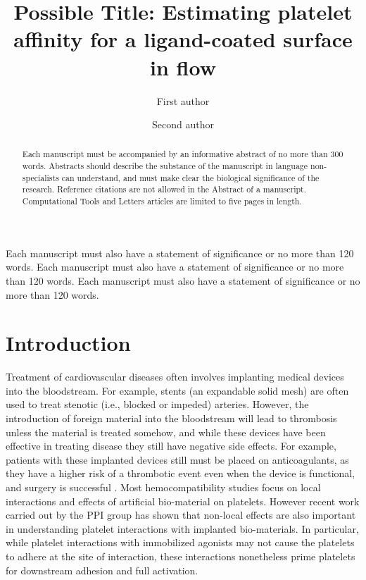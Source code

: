 \documentclass{biophys-new}
\title{Possible Title: Estimating platelet affinity for a
  ligand-coated surface in flow}
\author[1,*]{First author}
\author[2]{Second author}
\affil[1]{Institution A, Address A}
\affil[2]{Institution B, Address B}
\begin{document}
\begin{frontmatter}

\begin{abstract}
Each manuscript must be accompanied by an informative abstract of no
more than 300 words. Abstracts should describe the substance of the
manuscript in language non-specialists can understand, and must make
clear the biological significance of the research. Reference citations
are not allowed in the Abstract of a manuscript. Computational Tools
and Letters articles are limited to five pages in length. 
\end{abstract}

\begin{sigstatement}
Each manuscript must also have a statement of significance or no more
than 120 words. Each manuscript must also have a statement of
significance or no more than 120 words. Each manuscript must also have
a statement of significance or no more than 120 words. 
\end{sigstatement}
\end{frontmatter}

\section*{Introduction}

Treatment of cardiovascular diseases often involves implanting medical
devices into the bloodstream. For example, stents (an expandable solid
mesh) are often used to treat stenotic (i.e., blocked or impeded)
arteries. However, the introduction of foreign material into the
bloodstream will lead to thrombosis unless the material is treated
somehow, and while these devices have been effective in treating
disease they still have negative side effects. For example, patients
with these implanted devices still must be placed on anticoagulants,
as they have a higher risk of a thrombotic event even when the device
is functional, and surgery is successful \cite{Cannegieter1994}. Most
hemocompatibility studies focus on local interactions and effects of
artificial bio-material on platelets. However recent work
\cite{Corum2011,Corum2012} carried out by the PPI group has shown that
non-local effects are also important in understanding platelet
interactions with implanted bio-materials. In particular, while
platelet interactions with immobilized agonists may not cause the
platelets to adhere at the site of interaction, these interactions
nonetheless prime platelets for downstream adhesion and full
activation.
\end{document}
